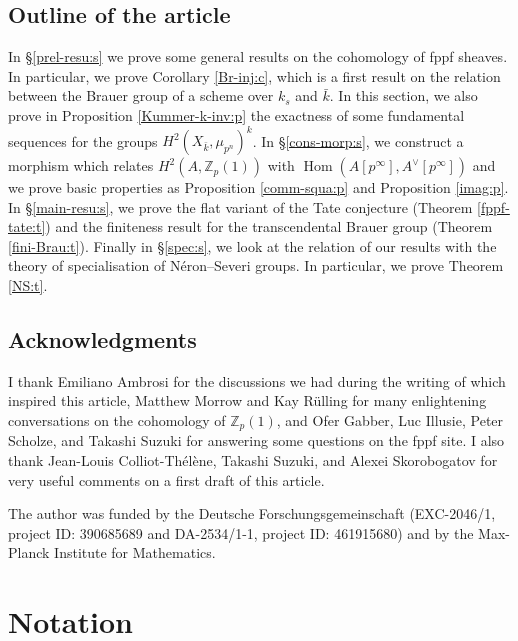 \documentclass[11pt]{amsart}
\newcommand{\spa}{\medskip}
\newcommand{\Z}{\mathbb{Z}}
\newcommand{\kbar}{{\bar{k}}}
\newcommand{\Zp}{{\mathbb{Z}_{p}}}
\DeclareMathOperator{\Hom}{Hom}
\newcommand{\ks}{{k_s}}
\newcommand{\mupn}{{\mu_{p^n}}}
\begin{document}
\subsection{Outline of the article}In §\ref{prel-resu:s} we prove some general results on the cohomology of fppf sheaves. In particular, we prove Corollary \ref{Br-inj:c}, which is a first result on the relation between the Brauer group of a scheme over $\ks$ and $\kbar$. In this section, we also prove in Proposition \ref{Kummer-k-inv:p} the exactness of some fundamental sequences for the groups $H^2(X_\kbar,\mupn)^k$. In §\ref{cons-morp:s}, we construct a morphism which relates $H^2(A,\Zp(1))$ with $\Hom(A[p^\infty],A^\vee[p^\infty])$ and we prove basic properties as Proposition \ref{comm-squa:p} and Proposition \ref{imag:p}. In §\ref{main-resu:s}, we prove the flat variant of the Tate conjecture (Theorem \ref{fppf-tate:t}) and the finiteness result for the transcendental Brauer group (Theorem \ref{fini-Brau:t}). Finally in §\ref{spec:s}, we look at the relation of our results with the theory of specialisation of Néron--Severi groups. In particular, we prove Theorem \ref{NS:t}.
 

\subsection{Acknowledgments} I thank Emiliano Ambrosi for the discussions we had during the writing of \cite{AD18} which inspired this article, Matthew Morrow and Kay Rülling for many enlightening conversations on the cohomology of $\Z_p(1)$, and Ofer Gabber, Luc Illusie, Peter Scholze, and Takashi Suzuki for answering some questions on the fppf site. I also thank Jean-Louis Colliot-Thélène, Takashi Suzuki, and Alexei Skorobogatov for very useful comments on a first draft of this article.

	\spa

The author was funded by the Deutsche Forschungsgemeinschaft (EXC-2046/1, project ID: 390685689 and DA-2534/1-1, project ID: 461915680) and by the Max-Planck Institute for Mathematics.
\section{Notation}
\end{document}
